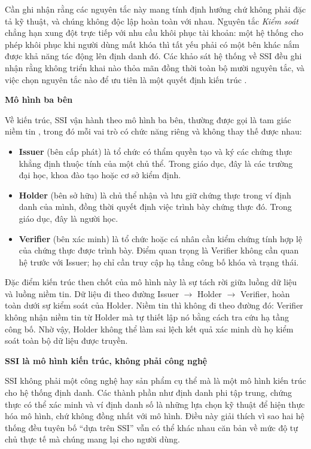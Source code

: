 Cần ghi nhận rằng các nguyên tắc này mang tính định hướng chứ không phải đặc tả kỹ thuật, và chúng không độc lập hoàn toàn với nhau. Nguyên tắc \emph{Kiểm soát} chẳng hạn xung đột trực tiếp với nhu cầu khôi phục tài khoản: một hệ thống cho phép khôi phục khi người dùng mất khóa thì tất yếu phải có một bên khác nắm được khả năng tác động lên định danh đó. Các khảo sát hệ thống về SSI đều ghi nhận rằng không triển khai nào thỏa mãn đồng thời toàn bộ mười nguyên tắc, và việc chọn nguyên tắc nào để ưu tiên là một quyết định kiến trúc \cite{Schardong2022, Muhle2018}.

\noindent \textbf{Mô hình ba bên}

Về kiến trúc, SSI vận hành theo mô hình ba bên, thường được gọi là tam giác niềm tin \cite{Preukschat2021}, trong đó mỗi vai trò có chức năng riêng và không thay thế được nhau:

\begin{itemize}
    \item \textbf{Issuer} (bên cấp phát) là tổ chức có thẩm quyền tạo và ký các chứng thực khẳng định thuộc tính của một chủ thể. Trong giáo dục, đây là các trường đại học, khoa đào tạo hoặc cơ sở kiểm định.
    \item \textbf{Holder} (bên sở hữu) là chủ thể nhận và lưu giữ chứng thực trong ví định danh của mình, đồng thời quyết định việc trình bày chứng thực đó. Trong giáo dục, đây là người học.
    \item \textbf{Verifier} (bên xác minh) là tổ chức hoặc cá nhân cần kiểm chứng tính hợp lệ của chứng thực được trình bày. Điểm quan trọng là Verifier không cần quan hệ trước với Issuer; họ chỉ cần truy cập hạ tầng công bố khóa và trạng thái.
\end{itemize}

Đặc điểm kiến trúc then chốt của mô hình này là sự tách rời giữa luồng dữ liệu và luồng niềm tin. Dữ liệu đi theo đường Issuer $\rightarrow$ Holder $\rightarrow$ Verifier, hoàn toàn dưới sự kiểm soát của Holder. Niềm tin thì không đi theo đường đó: Verifier không nhận niềm tin từ Holder mà tự thiết lập nó bằng cách tra cứu hạ tầng công bố. Nhờ vậy, Holder không thể làm sai lệch kết quả xác minh dù họ kiểm soát toàn bộ dữ liệu được truyền.

\noindent \textbf{SSI là mô hình kiến trúc, không phải công nghệ}

SSI không phải một công nghệ hay sản phẩm cụ thể mà là một mô hình kiến trúc cho hệ thống định danh. Các thành phần như định danh phi tập trung, chứng thực có thể xác minh và ví định danh số là những lựa chọn kỹ thuật để hiện thực hóa mô hình, chứ không đồng nhất với mô hình. Điều này giải thích vì sao hai hệ thống đều tuyên bố {``}dựa trên SSI{''} vẫn có thể khác nhau căn bản về mức độ tự chủ thực tế mà chúng mang lại cho người dùng.

